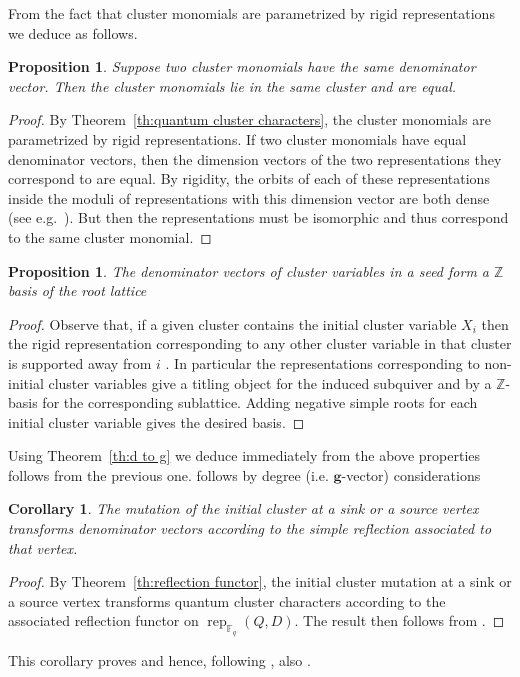 \documentclass[12pt]{amsart}
\newcommand{\sayS}[1]{\say[S]{#1}}
\newtheorem{corollary}[theorem]{Corollary}
\newtheorem{proposition}[theorem]{Proposition}
\newcommand{\bfg}{\mathbf{g}}
\newcommand{\FF}{\mathbb{F}}
\newcommand{\rep}{\operatorname{rep}}
\newcommand{\ZZ}{\mathbb{Z}}
\begin{document}
  From the fact that cluster monomials are parametrized by rigid representations we deduce \cite[Conjecture 7.6]{fomin-zelevinsky4} as follows.
  \begin{proposition}
    Suppose two cluster monomials have the same denominator vector.
    Then the cluster monomials lie in the same cluster and are equal.
  \end{proposition}
  \begin{proof}
    By Theorem~\ref{th:quantum cluster characters}, the cluster monomials are parametrized by rigid representations.
    \sayS{Update Theorem\ref{th:quantum cluster characters} to deal with cluster monomials}
    If two cluster monomials have equal denominator vectors, then the dimension vectors of the two representations they correspond to are equal.
    By rigidity, the orbits of each of these representations inside the moduli of representations with this dimension vector are both dense (see e.g.\ \cite[Corollary 2.2.5]{brion}).
    But then the representations must be isomorphic and thus correspond to the same cluster monomial.
  \end{proof}
  \begin{proposition}
    The denominator vectors of cluster variables in a seed form a $\ZZ$ basis of the root lattice
  \end{proposition}
  \begin{proof}
    Observe that, if a given cluster contains the initial cluster variable $X_i$ then the rigid representation corresponding to any other cluster variable in that cluster is supported away from $i$ \cite{some-result}.
    In particular the representations corresponding to non-initial cluster variables give a titling object for the induced subquiver and by \cite{some-other-result} a $\ZZ$-basis for the corresponding sublattice.
    Adding negative simple roots for each initial cluster variable gives the desired basis.
  \end{proof}
  Using Theorem~\ref{th:d to g} we deduce immediately from the above properties 
  \cite[Conjecture 7.10]{fomin-zelevinsky4} follows from the previous one.
  \cite[Conjecture 7.2]{fomin-zelevinsky4} follows by degree (i.e. $\bfg$-vector) considerations

  \begin{corollary}
    The mutation of the initial cluster at a sink or a source vertex transforms denominator vectors according to the simple reflection associated to that vertex.
  \end{corollary}
  \begin{proof}
    By Theorem~\ref{th:reflection functor}, the initial cluster mutation at a sink or a source vertex transforms quantum cluster characters according to the associated reflection functor on $\rep_{\FF_q}(Q,D)$.  The result then follows from \cite[Prop. 2.1]{dlab-ringel}.
  \end{proof}
  This corollary proves \cite[Conj. 2.8]{reading-stella} and hence, following \cite[Prop. 2.10]{reading-stella}, also \cite[Conj. 2.7]{reading-stella}.
\end{document}
